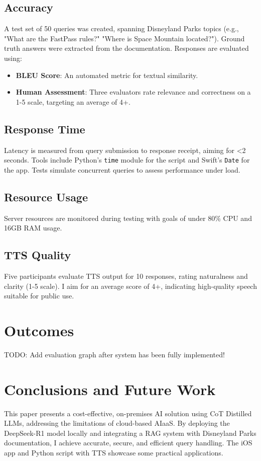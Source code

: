 \documentclass[11pt]{article}
\begin{document}
\subsection{Accuracy}
A test set of 50 queries was created, spanning Disneyland Parks topics (e.g., "What are the FastPass rules?" "Where is Space Mountain located?"). Ground truth answers were extracted from the documentation. Responses are evaluated using:
\begin{itemize}
    \item \textbf{BLEU Score}: An automated metric for textual similarity.
    \item \textbf{Human Assessment}: Three evaluators rate relevance and correctness on a 1-5 scale, targeting an average of 4+.
\end{itemize}

\subsection{Response Time}
Latency is measured from query submission to response receipt, aiming for <2 seconds. Tools include Python’s \texttt{time} module for the script and Swift’s \texttt{Date} for the app. Tests simulate concurrent queries to assess performance under load.

\subsection{Resource Usage}
Server resources are monitored during testing with goals of under 80\% CPU and 16GB RAM usage.

\subsection{TTS Quality}
Five participants evaluate TTS output for 10 responses, rating naturalness and clarity (1-5 scale). I aim for an average score of 4+, indicating high-quality speech suitable for public use.

\section{Outcomes}
TODO: Add evaluation graph after system has been fully implemented!

\section{Conclusions and Future Work}
\label{sec:conclusions}
This paper presents a cost-effective, on-premises AI solution using CoT Distilled LLMs, addressing the limitations of cloud-based AIaaS. By deploying the DeepSeek-R1 model locally and integrating a RAG system with Disneyland Parks documentation, I achieve accurate, secure, and efficient query handling. The iOS app and Python script with TTS showcase some practical applications.
\end{document}
